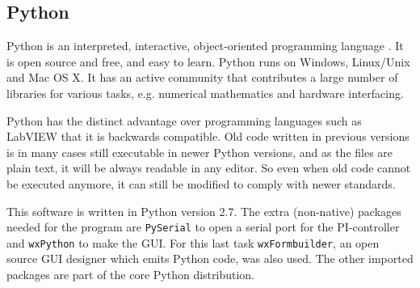\subsection{Python}
Python is an interpreted, interactive, object-oriented programming language \cite{python}. It is open source and free, and easy to learn. Python runs on Windows, Linux/Unix and Mac OS X. It has an active community that contributes a large number of libraries for various tasks, e.g. numerical mathematics and hardware interfacing.

Python has the distinct advantage over programming languages such as LabVIEW that it is backwards compatible. Old code written in previous versions is in many cases still executable in newer Python versions, and as the files are plain text, it will be always readable in any editor. So even when old code cannot be executed anymore, it can still be modified to comply with newer standards.

This software is written in Python version 2.7. The extra (non-native) packages needed for the program are \verb!PySerial! to open a serial port for the PI-controller and \verb!wxPython! to make the GUI. For this last task \verb!wxFormbuilder!, an open source GUI designer which emits Python code, was also used. The other imported packages are part of the core Python distribution.
